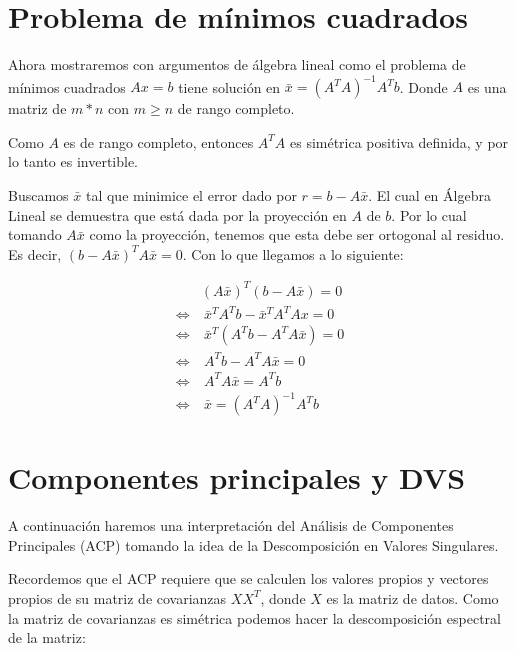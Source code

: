 \documentclass[12pt]{article}
\begin{document}

\section{Problema de mínimos cuadrados}

Ahora mostraremos con argumentos de álgebra lineal como el problema de mínimos cuadrados $Ax=b$ tiene solución en $\bar x = (A^TA)^{-1}A^Tb$. Donde $A$ es una matriz de $m * n$ con $m \geq n$ de rango completo.

Como $A$ es de rango completo, entonces $A^TA$ es simétrica positiva definida, y por lo tanto es invertible.

Buscamos $\bar x$ tal que minimice el error dado por $r = b - A\bar x$. El cual en Álgebra Lineal se demuestra que está dada por la proyección en $A$ de $b$. Por lo cual tomando $A\bar x$ como la proyección, tenemos que esta debe ser ortogonal al residuo. Es decir, $(b - A\bar x)^TA\bar x = 0$. Con lo que llegamos a lo siguiente:

\begin{align*}
& (A\bar x)^T(b - A\bar x) = 0\\
\Leftrightarrow & \ \bar x^TA^Tb - \bar x^TA^TAx = 0\\
\Leftrightarrow & \ \bar x^T (A^Tb - A^TA\bar x) = 0\\
\Leftrightarrow & \ A^Tb - A^TA\bar x = 0\\
\Leftrightarrow & \ A^TA\bar x = A^Tb\\
\Leftrightarrow & \ \bar x = (A^TA)^{-1}A^Tb
\end{align*}



\section{Componentes principales y DVS}

A continuación haremos una interpretación del Análisis de Componentes Principales (ACP) tomando la idea de la Descomposición en Valores Singulares.

Recordemos que el ACP requiere que se calculen los valores propios y vectores propios de su matriz de covarianzas $XX^T$, donde $X$ es la matriz de datos. Como la matriz de covarianzas es simétrica podemos hacer la descomposición espectral de la matriz:
\end{document}
